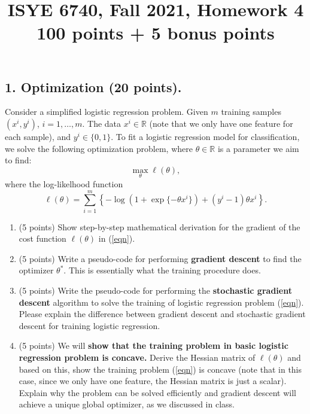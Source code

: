 \documentclass[twoside,10pt]{article}
\begin{document}
\title{ISYE 6740, Fall 2021, Homework 4\\ 
  100 points + 5 bonus points }
\date{}
\maketitle



\subsection*{\bf 1. Optimization (20 points).}

Consider a simplified logistic regression problem. 
Given $m$ training samples $(x^i, y^i)$, $i = 1, \ldots, m$. The data $x^i \in \mathbb R$ (note that we only have one feature for each sample), and $y^i \in \{0, 1\}$.  To fit a logistic regression model for classification, we solve the following optimization problem, where $\theta \in \mathbb R$ is a parameter we aim to find:
\begin{equation}
\max_\theta \ell (\theta), \label{eqn}
\end{equation}
where the log-likelhood function \[\ell(\theta) = \sum_{i=1}^m \left\{-\log (1+\exp\{-\theta x^i\}) + (y^i-1) \theta x^i\right\}.\]

\begin{enumerate}
\item (5 points) Show step-by-step mathematical derivation for the gradient of the cost function $\ell(\theta)$ in (\ref{eqn}).
\item (5 points) Write a pseudo-code  for performing {\bf gradient descent} to find the optimizer $\theta^*$. This is essentially what the training procedure does. 
\item (5 points) Write the pseudo-code for performing the {\bf stochastic gradient descent} algorithm to solve the training of logistic regression problem (\ref{eqn}). Please explain the difference between gradient descent and stochastic gradient descent for training logistic regression.
\item (5 points) We will {\bf show that the training problem in basic logistic regression problem is concave.} Derive the Hessian matrix of $\ell(\theta)$ and based on this, show the training problem (\ref{eqn}) is concave (note that in this case, since we only have one feature, the Hessian matrix is just a scalar). Explain why the problem can be solved efficiently and gradient descent will achieve a unique global optimizer, as we discussed in class. 
\end{enumerate}
\end{document}
